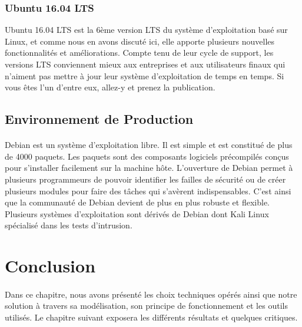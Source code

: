 	  \subsubsection{Ubuntu 16.04 LTS}
	    Ubuntu 16.04 LTS est la 6ème version LTS du système d'exploitation basé sur Linux, et comme nous en avons discuté ici, elle apporte plusieurs nouvelles fonctionnalités et améliorations. Compte tenu de leur cycle de support, les versions LTS conviennent mieux aux entreprises et aux utilisateurs finaux qui n'aiment pas mettre à jour leur système d'exploitation de temps en temps. Si vous êtes l'un d'entre eux, allez-y et prenez la publication.
	    

      \subsection{Environnement de Production}
	\paragraph{}
	  Debian est un système d'exploitation libre. Il est simple et est constitué de plus de 4000 paquets. Les paquets sont des composants logiciels précompilés conçus pour s'installer facilement sur la machine hôte. L'ouverture de Debian permet à plusieurs programmeurs de pouvoir identifier les failles de sécurité ou de créer plusieurs modules pour faire des tâches qui s'avèrent indispensables. C'est ainsi que la communauté de Debian devient de plus en plus robuste et flexible. Plusieurs systèmes d'exploitation sont dérivés de Debian dont Kali Linux spécialisé dans les tests d'intrusion. 
  
\section*{Conclusion}
		\paragraph{}
	  Dans ce chapitre, nous avons présenté les choix techniques opérés
	  ainsi que notre solution à travers sa modélisation, son principe de fonctionnement et les outils utilisés. 
	  Le chapitre suivant exposera les différents résultats et quelques critiques.	